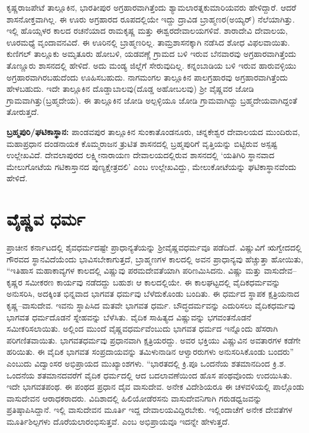 ಕೃಷ್ಣರಾಜಪೇಟೆ ತಾಲ್ಲೂಕಿನ, ಭಾರತೀಪುರ ಅಗ್ರಹಾರವಾಗಿತ್ತೆಂದು ಶ್ಯಾಮಲಾರತ್ನಕುಮಾರಿಯವರು ಹೇಳಿದ್ದಾರೆ. ಆದರೆ ಶಾಸನೋಕ್ತವಾಗಿಲ್ಲ. ಈ ಊರು ಅಗ್ರಹಾರದ ರೂಪದಲ್ಲಿಯೇ ಇದ್ದು ದ್ರಾವಿಡ ಬ್ರಾಹ್ಮಣರ(ಅಯ್ಯರ್​) ನೆಲೆಯಾಗಿತ್ತು. ಇಲ್ಲಿ ಹೊಯ್ಸಳರ ಕಾಲದ ರಚನೆಯಾದ ರಾಮಕೃಷ್ಣ ಮತ್ತು ಈಶ್ವರದೇವಾಲಯಗಳಿವೆ. ಶಾರಾದೇವಿ ದೇವಾಲಯ, ಊರಮಧ್ಯೆ ವೃಂದಾವನವಿದೆ. ಈ ಊರಿನಲ್ಲಿ ಬ್ರಾಹ್ಮಣರಿಲ್ಲ. ತಾಮ್ರಶಾಸನಕ್ಕಾಗಿ ನಡೆಸಿದ ಶೋಧ ವಿಫಲವಾಯಿತು. ಕುಣಿಗಲ್​ ತಾಲ್ಲೂಕು ಅಮೃತೂರು ಹೋಬಳಿ, ಯಡವಣ್ಣೆ ಗ್ರಾಮದ ಬಳಿ ಇರುವ ಬೆನವಾರವು ಅಗ್ರಹಾರವಾಗಿತ್ತೆಂದು ತೊಣ್ಣೂರು ಶಾಸನದಲ್ಲಿ ಹೇಳಿದೆ. ಅದು ಮಂಡ್ಯ ಜಿಲ್ಲೆಗೆ ಸೇರುವುದಿಲ್ಲ. ಕನ್ನಂಬಾಡಿಯ ಬಳಿ ಇರುವ ಹಾರುವಳ್ಳಿಯು ಅಗ್ರಹಾರವಾಗಿರಬಹುದೆಂದು ಊಹಿಸಬಹುದು. ನಾಗಮಂಗಲ ತಾಲ್ಲೂಕಿನ ಪಾಲಗ್ರಹಾರವು ಅಗ್ರಹಾರವಾಗಿತ್ತೆಂದು ಹೇಳಬಹುದು. ಇದೇ ತಾಲ್ಲೂಕಿನ ದೊಡ್ಡಾಬಾಲವು(ದೊಡ್ಡ ಅಹೋಬಲವು) ಶ‍್ರೀ ವೈಷ್ಣವರ ಜೋಡಿ ಗ್ರಾಮವಾಗಿತ್ತು(ಬ್ರಹ್ಮದೇಯ). ಈ ತಾಲ್ಲೂಕಿನ ಜೋಡಿ ಅಲ್ಪಳ್ಳಿಯೂ ಜೋಡಿ ಗ್ರಾಮವಾಗಿದ್ದು ಬ್ರಹ್ಮದೇಯವಾಗಿದ್ದಂತೆ ತೋರುತ್ತದೆ.

\textbf{ಬ್ರಹ್ಮಪುರಿ/ಘಟಿಕಾಸ್ಥಾನ:} ಪಾಂಡವಪುರ ತಾಲ್ಲೂಕಿನ ಸುಂಕಾತೊಂಡನೂರು, ಚನ್ನಕೇಶ್ವರ ದೇವಾಲಯದ ಮುಂದಿರುವ, ಮಹಾಪ್ರಧಾನ ದಂಡನಾಯಕ ಕೊಮ್ಮರಾಜನ ತ್ರುಟಿತ ಶಾಸನದಲ್ಲಿ ಬ್ರಹ್ಮಪುರಿಗೆ ವೃತ್ತಿಯನ್ನು ಬಿಟ್ಟಿರುವ ಅಸ್ಪಷ್ಟ ಉಲ್ಲೇಖವಿದೆ. ದೇವಲಾಪುರದ ಲಕ್ಷ್ಮೀನಾರಾಯಣ ದೇವಾಲಯದಲ್ಲಿರುವ ಶಾಸನದಲ್ಲಿ ‘ಯತಿಗಿರಿ ಸ್ಥಾನವಾದ ಮೇಲುಗೋಟೆಯ ಗಟಿಕಾಸ್ತಾನದ ಪುಣ್ಯಕ್ಷೇತ್ರದಲಿ’ ಎಂಬ ಉಲ್ಲೇಖವಿದ್ದು, ಮೇಲುಕೋಟೆಯನ್ನು ಘಟಿಕಾಸ್ಥಾನವೆಂದು ಹೇಳಿದೆ.


\section{ವೈಷ್ಣವ ಧರ್ಮ}

ಪ್ರಾಚೀನ ಕರ್ನಾಟದಲ್ಲಿ ಶೈವಧರ್ಮದಷ್ಟೇ ಪ್ರಾಧಾನ್ಯತೆಯನ್ನು ಶ‍್ರೀವೈಷ್ಣವಧರ್ಮವೂ ಪಡೆದಿದೆ. ವಿಷ್ಣುವಿಗೆ ಋಗ್ವೇದದಲ್ಲಿ ಗೌರವದ ಸ್ಥಾನವಿದೆಯೆಂದು ಭಾವಿಸಬೇಕಾಗುತ್ತದೆ, ಬ್ರಾಹ್ಮಣಗಳ ಕಾಲದಲ್ಲಿ ಅವನ ಪ್ರಾಧಾನ್ಯವು ಹೆಚ್ಚುತ್ತಾ ಹೋಯಿತು, “ಇತಿಹಾಸ ಮಹಾಕಾವ್ಯಗಳ ಕಾಲದಲ್ಲಿ ವಿಷ್ಣುವು ಪರಮದೇವತೆಯಾಗಿ ಪರಿಣಮಿಸಿದನು. ವಿಷ್ಣು ಮತ್ತು ವಾಸುದೇವ–ಕೃಷ್ಣರ ಸಮೀಕರಣ ಕಾರ್ಯವು ನಡೆದದ್ದು ಬಹುಶಃ ಆ ಕಾಲದಲ್ಲಿಯೇ. ಈ ಕಾಲಘಟ್ಟದಲ್ಲಿ ವೈದಿಕಧರ್ಮವನ್ನು ಅನುಸರಿಸಿ, ಅದಕ್ಕಿಂತ ಭಿನ್ನವಾದ ಭಾಗವತ ಧರ್ಮವು ಬೆಳೆದುಕೊಂಡು ಬಂದಿತು. ಈ ಧರ್ಮದ ಸ್ಥಾಪಕ ಕ್ಷತ್ರಿಯನಾದ ಕೃಷ್ಣ–ವಾಸುದೇವ. ಇವನು ಸ್ಥಾಪಿಸಿದ ಮತವೇ ಭಾಗವತ ಧರ್ಮ. ಬೌದ್ಧದರ್ಮವನ್ನು ಎದುರಿಸಲು ವೈದಿಕಧರ್ಮವು ಭಾಗವತ ಧರ್ಮದೊಡನೆ ಸ್ನೇಹವನ್ನು ಬೆಳೆಸಿತು. ವೈದಿಕ ಸಾಹಿತ್ಯದ ವಿಷ್ಣುವನ್ನು ಭಗವಂತನೊಡನೆ ಸಮೀಕರಿಸಲಾಯಿತು. ಅಲ್ಲಿಂದ ಮುಂದೆ ವೈಷ್ಣವಧರ್ಮವೆಂಬುದು ಭಾಗವತ ಧರ್ಮದ ಇನ್ನೊಂದು ಹೆಸರಾಗಿ ಪರಿಗಣಿತವಾಯಿತು. ಭಾಗವತಧರ್ಮವು ಪ್ರಧಾನವಾಗಿ ಕ್ಷತ್ರಿಯರದ್ದು. ಅವರ ಭಕ್ತಿಯು ವಿಷ್ಣುವಿನ ಅವತಾರಗಳ ಕಡೆಗೇ ಹರಿಯಿತು. ಈ ವೈದಿಕ ಭಾಗವತ ಸಂಪ್ರದಾಯವನ್ನು ತಮಿಳುನಾಡಿನ ಆಳ್ವಾರರುಗಳು ಅನುಸರಿಸಿಕೊಂಡು ಬಂದರು” ಎಂಬುದು ವಿದ್ವಾಂಸರ ಅಭಿಪ್ರಾಯದ ಮುಖ್ಯಾಂಶಗಳು. “ಭಾರತದಲ್ಲಿ ಕ್ರಿ.ಪೂ ಒಂದನೆಯ ಶತಮಾನದಿಂದ ಕ್ರಿ.ಶ. ಒಂದನೆಯ ಶತಮಾನದವರೆಗೆ ವೈದಿಕ ಧರ್ಮದಲ್ಲಿ ಆದ ಬದಲಾವಣೆಯಿಂದ ಹೊಸ ಪಂಥವೊಂದು ಉದಯಿಸಿತು. ಇದೇ ಭಾಗವತಪಂಥ. ಈ ಪಂಥದ ಪ್ರಧಾನ ದೈವ ವಾಸುದೇವ. ಅನೇಕ ವಿದೇಶಿಯರೂ ಈ ಚಳವಳಿಯಲ್ಲಿ ಪಾಲ್ಗೊಂಡು ವಾಸುದೇವನ ಆರಾಧಕರಾದರು. ವಿದಿಶಾದಲ್ಲಿ ಹಿಲಿಯೋಡೆರಸನು ವಾಸುದೇವನಿಗಾಗಿ ಗರುಡಧ್ವಜವನ್ನು ಪ್ರತಿಷ್ಠಾಪಿಸಿದ್ದಾನೆ. ಇಲ್ಲಿ ವಾಸುದೇವನ ಮೂರ್ತಿ ಇದ್ದ ದೇವಾಲಯವಿದ್ದಿರಬೇಕು. ಇಲ್ಲಿಂದಾಚೆಗೆ ಅನೇಕ ದೇವತೆಗಳ ಮೂರ್ತಿಶಿಲ್ಪಗಳು ದೊರೆಯಲಾರಂಭಿಸುತ್ತವೆ. ಎಂಬ ಅಭಿಪ್ರಾಯವೂ ಇದನ್ನೇ ಹೇಳುತ್ತದೆ.

